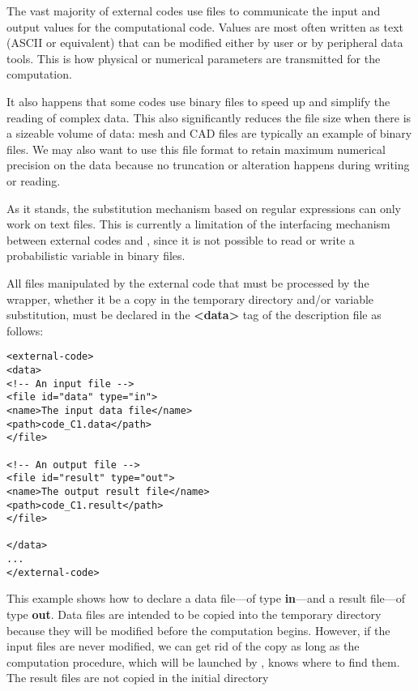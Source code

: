 The vast majority of external codes use files to communicate the input and output values for the computational code. Values are most often written as text (ASCII or equivalent) that can be modified either by user or by peripheral data tools. This is how physical or numerical parameters are transmitted for the computation.

It also happens that some codes use binary files to speed up and simplify the reading of complex data. This also significantly reduces the file size when there is a sizeable volume of data: mesh and CAD files are typically an example of binary files. We may also want to use this file format to retain maximum numerical precision on the data because no truncation or alteration happens during writing or reading.

As it stands, the substitution mechanism based on regular expressions can only work on text files. This is currently a limitation of the interfacing mechanism between external codes and \OT, since it is not possible to read or write a probabilistic variable in binary files.

All files manipulated by the external code that must be processed by the wrapper, whether it be a copy in the temporary directory and/or variable substitution, must be declared in the {\bf <data>} tag of the description file as follows:

\lstset{language=XML, basicstyle=\normalsize}
\begin{lstlisting}[frame=TBRL]
<external-code>
<data>
<!-- An input file -->
<file id="data" type="in">
<name>The input data file</name>
<path>code_C1.data</path>
</file>

<!-- An output file -->
<file id="result" type="out">
<name>The output result file</name>
<path>code_C1.result</path>
</file>

</data>
...
</external-code>
\end{lstlisting}

This example shows how to declare a data file---of type {\bf in}---and a result file---of type {\bf out}. Data files are intended to be copied into the temporary directory because they will be modified before the computation begins. However, if the input files are never modified, we can get rid of the copy as long as the computation procedure, which will be launched by \OT, knows where to find them. The result files are not copied in the initial directory%

